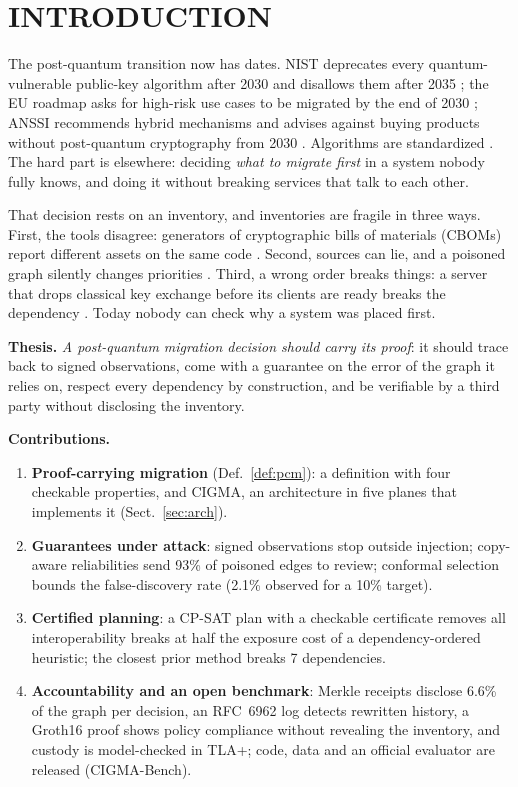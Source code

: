 \documentclass[a4paper,twoside]{article}
\newcommand{\cigma}{CIGMA\xspace}
\begin{document}
\section{\uppercase{Introduction}}
\label{sec:intro}

The post-quantum transition now has dates. NIST deprecates every quantum-vulnerable public-key algorithm after 2030 and disallows them after 2035 \cite{nist2026ir8547}; the EU roadmap asks for high-risk use cases to be migrated by the end of 2030 \cite{eu2025roadmap}; ANSSI recommends hybrid mechanisms and advises against buying products without post-quantum cryptography from 2030 \cite{anssi2023pqc}. Algorithms are standardized \cite{nist2024fips203,nist2024fips204,nist2024fips205}. The hard part is elsewhere: deciding \emph{what to migrate first} in a system nobody fully knows, and doing it without breaking services that talk to each other.

That decision rests on an inventory, and inventories are fragile in three ways. First, the tools disagree: generators of cryptographic bills of materials (CBOMs) report different assets on the same code \cite{bogli2026bfcbom}. Second, sources can lie, and a poisoned graph silently changes priorities \cite{xi2023roar}. Third, a wrong order breaks things: a server that drops classical key exchange before its clients are ready breaks the dependency \cite{sharma2026dependency}. Today nobody can check why a system was placed first.

\textbf{Thesis.} \emph{A post-quantum migration decision should carry its proof}: it should trace back to signed observations, come with a guarantee on the error of the graph it relies on, respect every dependency by construction, and be verifiable by a third party without disclosing the inventory.

\textbf{Contributions.}
\begin{enumerate}
\item \textbf{Proof-carrying migration} (Def.~\ref{def:pcm}): a definition with four checkable properties, and \cigma, an architecture in five planes that implements it (Sect.~\ref{sec:arch}).
\item \textbf{Guarantees under attack}: signed observations stop outside injection; copy-aware reliabilities send 93\% of poisoned edges to review; conformal selection bounds the false-discovery rate (2.1\% observed for a 10\% target).
\item \textbf{Certified planning}: a CP-SAT plan with a checkable certificate removes all interoperability breaks at half the exposure cost of a dependency-ordered heuristic; the closest prior method \cite{sharma2026dependency} breaks 7 dependencies.
\item \textbf{Accountability and an open benchmark}: Merkle receipts disclose 6.6\% of the graph per decision, an RFC~6962 log detects rewritten history, a Groth16 proof shows policy compliance without revealing the inventory, and custody is model-checked in TLA+; code, data and an official evaluator are released (CIGMA-Bench).
\end{enumerate}
\end{document}
